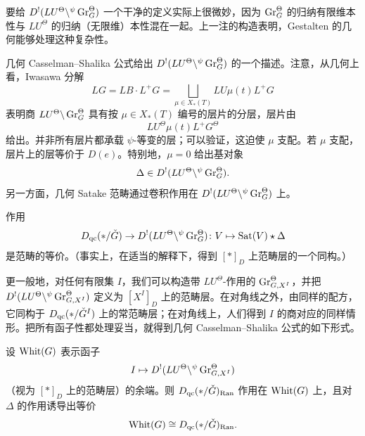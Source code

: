 要给 $D^{!}(LU^{\Theta}\backslash{}^{\psi}\operatorname{Gr}^{\Theta}_{G})$ 一个干净的定义实际上很微妙，因为 $\operatorname{Gr}^{\Theta}_{G}$ 的归纳有限维本性与 $LU^{\Theta}$ 的归纳（无限维）本性混在一起。上一注的构造表明，Gestalten 的几何能够处理这种复杂性。

几何 Casselman--Shalika 公式给出 $D^{!}(LU^{\Theta}\backslash{}^{\psi}\operatorname{Gr}^{\Theta}_{G})$ 的一个描述。注意，从几何上看，Iwasawa 分解
\[
LG=LB\cdot L^{+}G=\bigsqcup_{\mu\in X_{*}(T)}LU\mu(t)L^{+}G
\]
表明商 $LU^{\Theta}\backslash\operatorname{Gr}^{\Theta}_{G}$ 具有按 $\mu\in X_{*}(T)$ 编号的层片的分层，层片由
\[
LU^{\Theta}\mu(t)L^{+}G^{\Theta}
\]
给出。并非所有层片都承载 $\psi$-等变的层；可以验证，这迫使 $\mu$ 支配。若 $\mu$ 支配，层片上的层等价于 $D(e)$。特别地，$\mu=0$ 给出基对象
\[
\Delta\in D^{!}(LU^{\Theta}\backslash{}^{\psi}\operatorname{Gr}^{\Theta}_{G}).
\]
另一方面，几何 Satake 范畴通过卷积作用在 $D^{!}(LU^{\Theta}\backslash{}^{\psi}\operatorname{Gr}^{\Theta}_{G})$ 上。

\begin{theorem}
作用
\[
D_{\mathrm{qc}}(*/\check{G})\to D^{!}(LU^{\Theta}\backslash{}^{\psi}\operatorname{Gr}^{\Theta}_{G})\colon V\mapsto\operatorname{Sat}(V)\star\Delta
\]
是范畴的等价。（事实上，在适当的解释下，得到 $[*]_{D}$ 上范畴层的一个同构。）
\end{theorem}

更一般地，对任何有限集 $I$，我们可以构造带 $LU^{\Theta}$-作用的 $\operatorname{Gr}^{\Theta}_{G,X^{I}}$，并把 $D^{!}(LU^{\Theta}\backslash{}^{\psi}\operatorname{Gr}^{\Theta}_{G,X^{I}})$ 定义为 $[X^{I}]_{D}$ 上的范畴层。在对角线之外，由同样的配方，它同构于 $D_{\mathrm{qc}}(*/\check{G}^{I})$ 上的常范畴层；在对角线上，人们得到 $I$ 的商对应的同样情形。把所有函子性都处理妥当，就得到几何 Casselman--Shalika 公式的如下形式。

\begin{corollary}
设 $\operatorname{Whit}(G)$ 表示函子
\[
I\mapsto D^{!}(LU^{\Theta}\backslash{}^{\psi}\operatorname{Gr}^{\Theta}_{G,X^{I}})
\]
（视为 $[*]_{D}$ 上的范畴层）的余端。则 $D_{\mathrm{qc}}(*/\check{G})_{\mathrm{Ran}}$ 作用在 $\operatorname{Whit}(G)$ 上，且对 $\Delta$ 的作用诱导出等价
\[
\operatorname{Whit}(G)\cong D_{\mathrm{qc}}(*/\check{G})_{\mathrm{Ran}}.
\]
\end{corollary}

